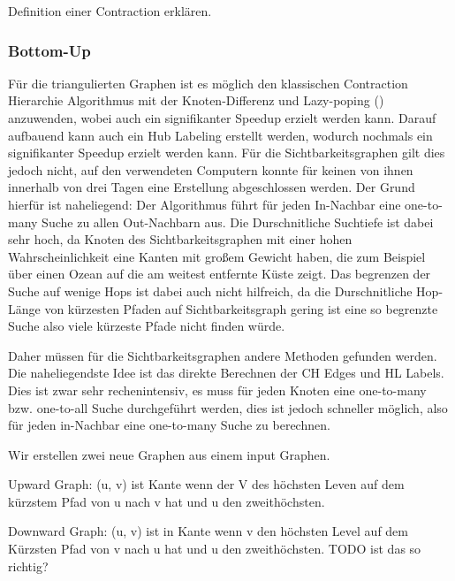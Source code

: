 Definition einer Contraction erklären.


\subsubsection{Bottom-Up}


\clearpage


Für die triangulierten Graphen ist es möglich den klassischen Contraction Hierarchie Algorithmus mit der Knoten-Differenz und Lazy-poping (\cite{geisberger2008contraction}) anzuwenden, wobei auch ein signifikanter Speedup erzielt werden kann. 
Darauf aufbauend kann auch ein Hub Labeling erstellt werden, wodurch nochmals ein signifikanter Speedup erzielt werden kann.
Für die Sichtbarkeitsgraphen gilt dies jedoch nicht, auf den verwendeten Computern konnte für keinen von ihnen innerhalb von drei Tagen eine Erstellung abgeschlossen werden.
Der Grund hierfür ist naheliegend: Der Algorithmus führt für jeden In-Nachbar eine one-to-many Suche zu allen Out-Nachbarn aus.
Die Durschnitliche Suchtiefe ist dabei sehr hoch, da Knoten des Sichtbarkeitsgraphen mit einer hohen Wahrscheinlichkeit eine Kanten mit großem Gewicht haben, die zum Beispiel über einen Ozean auf die am weitest entfernte Küste zeigt.
Das begrenzen der Suche auf wenige Hops ist dabei auch nicht hilfreich, da die Durschnitliche Hop-Länge von kürzesten Pfaden auf Sichtbarkeitsgraph gering ist eine so begrenzte Suche also viele kürzeste Pfade nicht finden würde.

Daher müssen für die Sichtbarkeitsgraphen andere Methoden gefunden werden.
Die naheliegendste Idee ist das direkte Berechnen der CH Edges und HL Labels.
Dies ist zwar sehr rechenintensiv, es muss für jeden Knoten eine one-to-many bzw. one-to-all Suche durchgeführt werden, dies ist jedoch schneller möglich, also für jeden in-Nachbar eine one-to-many Suche zu berechnen.



Wir erstellen zwei neue Graphen aus einem input Graphen.

Upward Graph: (u, v) ist Kante wenn der V des höchsten Leven auf dem kürzstem Pfad von u nach v hat und u den zweithöchsten.

Downward Graph: (u, v) ist in Kante wenn v den höchsten Level auf dem Kürzsten Pfad von v nach u hat und u den zweithöchsten.
TODO ist das so richtig?

